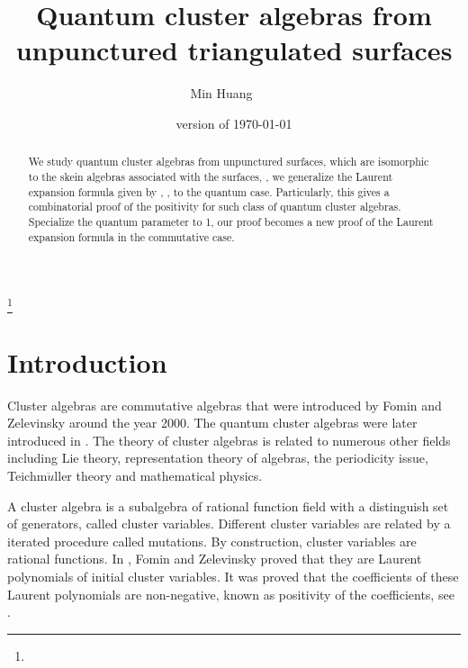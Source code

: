 \documentclass[10pt]{amsart}
\theoremstyle{theorems}
\begin{document}
\title [Quantum cluster algebras from unpunctured triangulated surfaces]
 {Quantum cluster algebras from unpunctured triangulated surfaces}


\author{Min Huang $\;\;\;\;\;\;$}
\address{Min Huang
\newline D\'{e}partement de math\'{e}matiques, Universit\'{e} de Sherbrooke, Sherbrooke, Qu\'{e}bec,
J1K 2R1, Canada}

\date{version of \today}



\thanks{}

\maketitle

\vspace{-25pt}

\begin{abstract}

We study quantum cluster algebras from unpunctured surfaces, which are isomorphic to the skein algebras associated with the surfaces, \cite{M}, we generalize the Laurent expansion formula given by \cite{ST}, \cite{MS}, \cite{MSW} to the quantum case. Particularly, this gives a combinatorial proof of the positivity for such class of quantum cluster algebras. Specialize the quantum parameter to 1, our proof becomes a new proof of the Laurent expansion formula in the commutative case.

\end{abstract}

\smallskip

\section{Introduction}

Cluster algebras are commutative algebras that were introduced by Fomin and Zelevinsky around the year 2000. The quantum cluster algebras were later introduced in \cite{BZ}. The theory of cluster algebras is related to numerous other fields including Lie theory, representation theory of algebras, the periodicity issue, Teichm$\ddot{u}$ller theory and mathematical physics.

\medskip

A cluster algebra is a subalgebra of rational function field with a distinguish set of generators, called cluster variables. Different cluster variables are related by a iterated procedure called mutations. By construction, cluster variables are rational functions. In \cite{fz1}, Fomin and Zelevinsky proved that they are Laurent polynomials of initial cluster variables. It was proved that the coefficients of these Laurent polynomials are non-negative, known as positivity of the coefficients, see \cite{LS,GHKK}.
\end{document}
